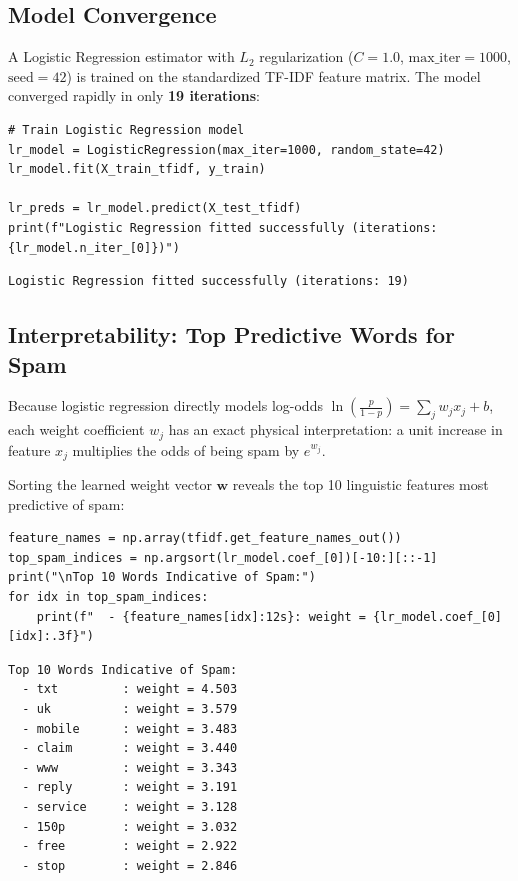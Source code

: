 \documentclass[12pt]{article}
\begin{document}
\subsection{Model Convergence}
A Logistic Regression estimator with $L_2$ regularization ($C=1.0$, $\text{max\_iter}=1000$, $\text{seed}=42$) is trained on the standardized TF-IDF feature matrix. The model converged rapidly in only \textbf{19 iterations}:

\begin{lstlisting}[style=code]
# Train Logistic Regression model
lr_model = LogisticRegression(max_iter=1000, random_state=42)
lr_model.fit(X_train_tfidf, y_train)

lr_preds = lr_model.predict(X_test_tfidf)
print(f"Logistic Regression fitted successfully (iterations: {lr_model.n_iter_[0]})")
\end{lstlisting}

\begin{lstlisting}[style=output]
Logistic Regression fitted successfully (iterations: 19)
\end{lstlisting}

\subsection{Interpretability: Top Predictive Words for Spam}
Because logistic regression directly models log-odds $\ln(\frac{p}{1-p}) = \sum_j w_j x_j + b$, each weight coefficient $w_j$ has an exact physical interpretation: a unit increase in feature $x_j$ multiplies the odds of being spam by $e^{w_j}$. 

Sorting the learned weight vector $\mathbf{w}$ reveals the top 10 linguistic features most predictive of spam:

\begin{lstlisting}[style=code]
feature_names = np.array(tfidf.get_feature_names_out())
top_spam_indices = np.argsort(lr_model.coef_[0])[-10:][::-1]
print("\nTop 10 Words Indicative of Spam:")
for idx in top_spam_indices:
    print(f"  - {feature_names[idx]:12s}: weight = {lr_model.coef_[0][idx]:.3f}")
\end{lstlisting}

\begin{lstlisting}[style=output]
Top 10 Words Indicative of Spam:
  - txt         : weight = 4.503
  - uk          : weight = 3.579
  - mobile      : weight = 3.483
  - claim       : weight = 3.440
  - www         : weight = 3.343
  - reply       : weight = 3.191
  - service     : weight = 3.128
  - 150p        : weight = 3.032
  - free        : weight = 2.922
  - stop        : weight = 2.846
\end{lstlisting}
\end{document}
